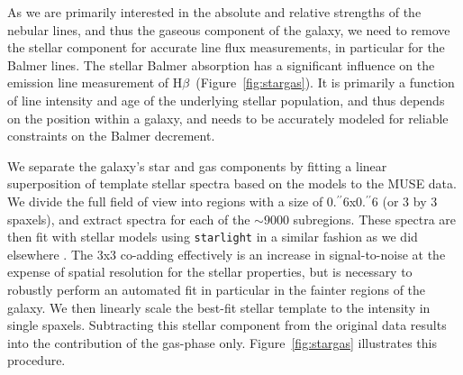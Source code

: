 \documentclass[traditabstract]{aa}
\newcommand{\farc}{\hbox{$.\!\!^{\prime\prime}$}}
\newcommand{\hb}{H$\beta$}
\begin{document}
As we are primarily interested in the absolute and relative strengths of the nebular lines, and thus the gaseous component of the galaxy, we need to remove the stellar component for accurate line flux measurements, in particular for the Balmer lines. The stellar Balmer absorption has a significant influence on the emission line measurement of \hb\, (Figure~\ref{fig:stargas}). It is primarily a function of line intensity and age of the underlying stellar population, and thus depends on the position within a galaxy, and needs to be accurately modeled for reliable constraints on the Balmer decrement.

We separate the galaxy's star and gas components by fitting a linear superposition of template stellar spectra based on the \citet{2003MNRAS.344.1000B} models to the MUSE data. We divide the full field of view into regions with a size of 0\farc{6}x0\farc{6} (or 3 by 3 spaxels), and extract spectra for each of the $\sim9000$ subregions. These spectra are then fit with stellar models using \texttt{starlight} \citep{2005MNRAS.358..363C, 2009RMxAC..35..127C} in a similar fashion as we did elsewhere \citep{2016MNRAS.455.4087G, 2016arXiv160703446K, 2016arXiv160900013P}. The 3x3 co-adding effectively is an increase in signal-to-noise at the expense of spatial resolution for the stellar properties, but is necessary to robustly perform an automated fit in particular in the fainter regions of the galaxy. We then linearly scale the best-fit stellar template to the intensity in single spaxels. Subtracting this stellar component from the original data results into the contribution of the gas-phase only. Figure~\ref{fig:stargas} illustrates this procedure.
\end{document}
